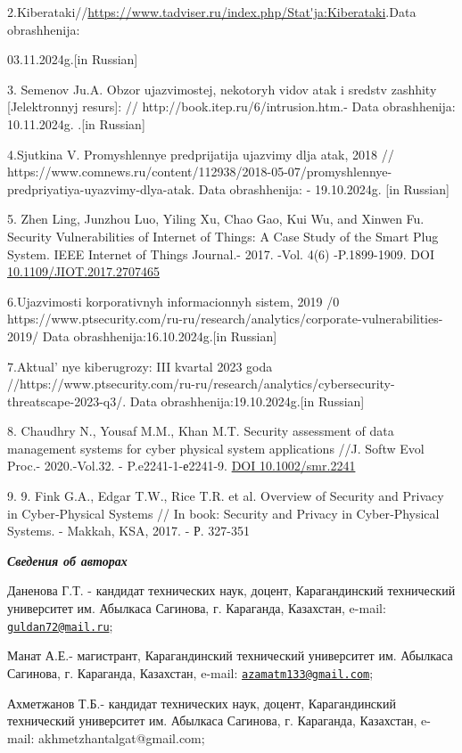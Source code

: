 2.Kiberataki//\url{https://www.tadviser.ru/index.php/Stat'ja:Kiberataki}.Data
obrashhenija:

03.11.2024g.{[}in Russian{]}

3. Semenov Ju.A. Obzor ujazvimostej, nekotoryh vidov atak i sredstv
zashhity {[}Jelektronnyj resurs{]}: //
http://book.itep.ru/6/intrusion.htm.- Data obrashhenija: 10.11.2024g.
.{[}in Russian{]}

4.Sjutkina V. Promyshlennye predprijatija ujazvimy dlja atak, 2018 //
https://www.comnews.ru/content/112938/2018-05-07/promyshlennye-predpriyatiya-uyazvimy-dlya-atak.
Data obrashhenija: - 19.10.2024g. {[}in Russian{]}

5. Zhen Ling, Junzhou Luo, Yiling Xu, Chao Gao, Kui Wu, and Xinwen Fu.
Security Vulnerabilities of Internet of Things: A Case Study of the
Smart Plug System. IEEE Internet of Things Journal.- 2017. -Vol. 4(6)
-P.1899-1909. DOI
\href{https://doi.org/10.1109/JIOT.2017.2707465}{10.1109/JIOT.2017.2707465}

6.Ujazvimosti korporativnyh informacionnyh sistem, 2019 /0
https://www.ptsecurity.com/ru-ru/research/analytics/corporate-vulnerabilities-2019/
Data obrashhenija:16.10.2024g.{[}in Russian{]}

7.Aktual' nye kiberugrozy: III kvartal 2023 goda
//https://www.ptsecurity.com/ru-ru/research/analytics/cybersecurity-threatscape-2023-q3/.
Data obrashhenija:19.10.2024g.{[}in Russian{]}

8. Chaudhry N., Yousaf M.M., Khan M.T. Security assessment of data
management systems for cyber physical system applications //J. Softw
Evol Proc.- 2020.-Vol.32. - P.e2241-1-е2241-9.
\href{https://doi.org/10.1002/smr.2241}{DOI 10.1002/smr.2241}

9. 9. Fink G.A., Edgar T.W., Rice T.R. et al. Overview of Security and
Privacy in Cyber‐Physical Systems // In book: Security and Privacy in
Cyber‐Physical Systems. - Makkah, KSA, 2017. - Р. 327-351

\emph{{\bfseries Сведения об авторах}}

Даненова Г.Т. - кандидат технических наук, доцент, Карагандинский
технический университет им. Абылкаса Сагинова, г. Караганда, Казахстан,
e-mail: \href{mailto:guldan72@mail.ru}{\nolinkurl{guldan72@mail.ru}};

Манат А.Е.- магистрант, Карагандинский технический университет им.
Абылкаса Сагинова, г. Караганда, Казахстан, e-mail:
\href{mailto:azamatm133@gmail.com}{\nolinkurl{azamatm133@gmail.com}};

Ахметжанов Т.Б.- кандидат технических наук, доцент, Карагандинский
технический университет им. Абылкаса Сагинова, г. Караганда, Казахстан,
e-mail: akhmetzhantalgat@gmail.com;


